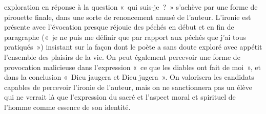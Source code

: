 {\begin{itemize}[label=\textbullet]
exploration en réponse à la question «~qui suis-je~?~» s'achève par une forme de
pirouette finale, dans une sorte de renoncement amusé de l'auteur. L'ironie est
présente avec l'évocation presque réjouie des péchés en début et en fin de
paragraphe («~je ne puis me définir que par rapport aux péchés que j'ai tous
pratiqués~») insistant sur la façon dont le poète a sans doute exploré avec appétit
l'ensemble des plaisirs de la vie. On peut également percevoir une forme de
provocation malicieuse dans l'expression «~ce que les diables ont fait de moi~», et dans
la conclusion «~Dieu jaugera et Dieu jugera~». On valorisera les candidats capables de
percevoir l'ironie de l'auteur, mais on ne sanctionnera pas un élève qui ne verrait là
que l'expression du sacré et l'aspect moral et spirituel de l'homme comme essence de
son identité.
\end{itemize}}%
